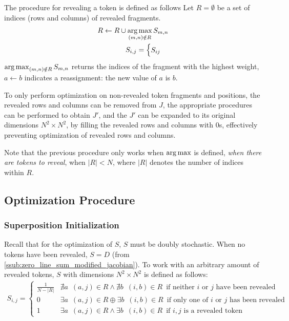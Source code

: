 The procedure for revealing a token is defined as follows Let $R=\emptyset$ be a set of indices (rows and columns) of revealed fragments.
\begin{align*}
    R\leftarrow R\cup \operatorname*{arg\,max}_{(m,n)\notin R}S_{m,n}\\
    S_{i,j}=
    \begin{cases}
        S_{ij}
    \end{cases}
\end{align*}
$\operatorname*{arg\,max}_{(m,n)\notin R}S_{m,n}$ returns the indices of the fragment with the highest weight, $a\leftarrow b$ indicates a reassignment: the new value of $a$ is $b$.

To only perform optimization on non-revealed token fragments and positions, the revealed rows and columns can be removed from $J$, the appropriate procedures can be performed to obtain $J'$, and the $J'$ can be expanded to its original dimensions $N^2\times N^2$, by filling the revealed rows and columns with $0$s, effectively preventing optimization of revealed rows and columns.

Note that the previous procedure only works when $\operatorname*{arg\,max}$ is defined, \emph{when there are tokens to reveal}, when  $|R|<N$, where $|R|$ denotes the number of indices within $R$.

\subsection{Optimization Procedure}%
\label{sub:optimization_procedure}
\subsubsection{Superposition Initialization}%
\label{ssub:superposition_initialization}
Recall that for the optimization of $S$, $S$ must be doubly stochastic. When no tokens have been revealed, $S=D$ (from \ref{ssub:zero_line_sum_modified_jacobian}). To work with an arbitrary amount of revealed tokens, $S$ with dimensions $N^2 \times N^2$ is defined as follows:
\begin{align*}
S_{i,j}=
\begin{cases}
    \frac{1}{N-|R|}& \nexists a\enspace (a,j)\in R \land \nexists b\enspace (i,b)\in R\enspace \text{if neither $i$ or $j$ have been revealed}\\
    0& \exists a\enspace (a,j)\in R \oplus \exists b\enspace (i,b)\in R\enspace \text{if only one of $i$ or $j$ has been revealed}\\
    1& \exists a\enspace (a,j)\in R \land \exists b\enspace (i,b)\in R\enspace \text{if $i,j$ is a revealed token}
\end{cases}
\end{align*}

